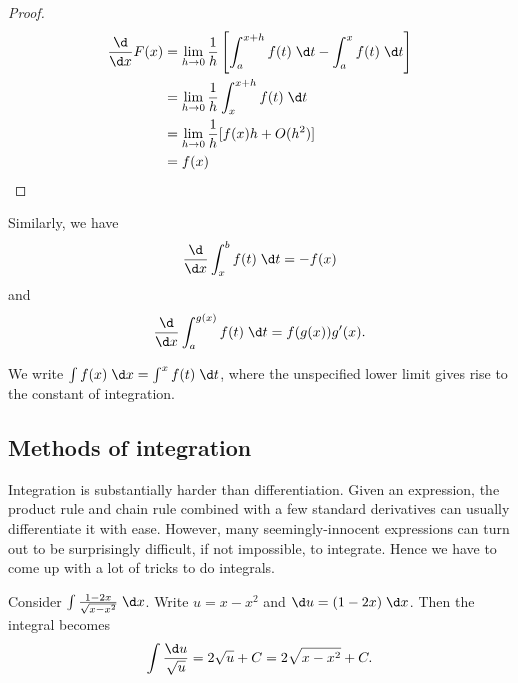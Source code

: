 \documentclass[a4paper]{article}
\begin{document}
\begin{proof}
  \begin{align*}
    \frac{\d}{\d x}F(x) &= \lim_{h\to 0}\frac{1}{h}\left[\int_a^{x+h}f(t)\;\d t - \int_a^x f(t)\;\d t\right]\\
    &= \lim_{h\to 0} \frac{1}{h}\int_x^{x+h}f(t) \;\d t\\
    &= \lim_{h\to 0} \frac{1}{h}[f(x)h + O(h^2)]\\
    &= f(x)
  \end{align*}
\end{proof}
Similarly, we have
\[
  \frac{\d}{\d x}\int_x^b f(t)\;\d t = -f(x)
\]
and
\[
  \frac{\d}{\d x}\int_a^{g(x)} f(t)\;\d t = f(g(x))g'(x).
\]

\begin{notation}
  We write $\int f(x)\;\d x= \int^x f(t)\;\d t$, where the unspecified lower limit gives rise to the constant of integration.
\end{notation}

\subsection{Methods of integration}
Integration is substantially harder than differentiation. Given an expression, the product rule and chain rule combined with a few standard derivatives can usually differentiate it with ease. However, many seemingly-innocent expressions can turn out to be surprisingly difficult, if not impossible, to integrate. Hence we have to come up with a lot of tricks to do integrals.

\begin{eg}
  Consider $\int \frac{1 - 2x}{\sqrt{x - x^2}}\;\d x$. Write $u = x - x^2$ and $\d u = (1 - 2x)\;\d x$. Then the integral becomes
  \[
    \int \frac{\d u}{\sqrt{u}} = 2\sqrt{u} + C = 2\sqrt{x - x^2} + C.
  \]
\end{eg}
\end{document}
